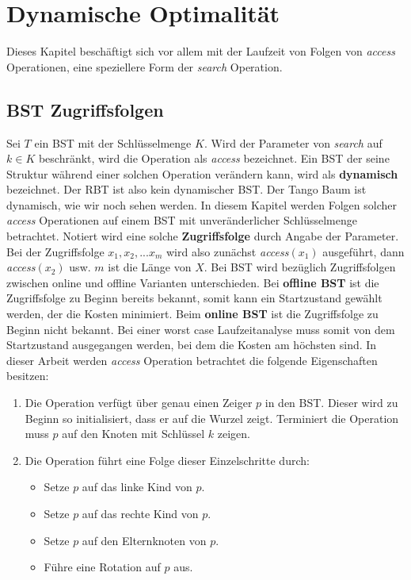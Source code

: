 \documentclass[a4paper,12pt]{article}
\begin{document}
\section{Dynamische Optimalität}
Dieses Kapitel beschäftigt sich vor allem mit der Laufzeit von Folgen von \textit{access} Operationen, eine speziellere Form der \textit{search} Operation.  
\subsection{BST Zugriffsfolgen}
Sei $T$ ein BST mit der Schlüsselmenge $K$. Wird der Parameter von \textit{search} auf $k \in K $ beschränkt, wird  die Operation als \textit{access} bezeichnet. Ein BST der seine Struktur während einer solchen Operation verändern kann, wird als \textbf{dynamisch} bezeichnet. Der RBT ist also kein dynamischer BST. Der Tango Baum ist dynamisch, wie wir noch sehen werden. In diesem Kapitel werden Folgen solcher \textit{access} Operationen auf einem BST mit unveränderlicher Schlüsselmenge betrachtet. Notiert wird eine solche \textbf{Zugriffsfolge} durch Angabe der Parameter. Bei der Zugriffsfolge $x_1,x_2,...x_m$ wird also zunächst \textit{access}$(x_1)$ ausgeführt, dann \textit{access}$(x_2)$ usw. $m$ ist die Länge von $X$. Bei BST wird bezüglich Zugriffsfolgen zwischen online und offline Varianten unterschieden. Bei \textbf{offline BST} ist die Zugriffsfolge zu Beginn bereits bekannt, somit kann ein Startzustand gewählt werden, der die Kosten minimiert. Beim \textbf{online BST} ist die Zugriffsfolge zu Beginn nicht bekannt. Bei einer worst case Laufzeitanalyse muss somit von dem Startzustand ausgegangen werden, bei dem die Kosten am höchsten sind.
In dieser Arbeit werden \textit{access} Operation betrachtet die folgende Eigenschaften besitzen:

\begin{enumerate} 
	\item Die Operation verfügt über genau einen Zeiger $p$ in den BST. Dieser wird zu Beginn so initialisiert, dass er auf die Wurzel zeigt. Terminiert die Operation muss $p$ auf den Knoten mit Schlüssel $k$ zeigen.
	\item Die Operation führt eine Folge dieser Einzelschritte durch:
	\begin{itemize}
		\item Setze $p$ auf das linke Kind von $p$.
		\item Setze $p$ auf das rechte Kind von $p$.
		\item Setze $p$ auf den Elternknoten von $p$.
		\item Führe eine Rotation auf $p$ aus.
	\end{itemize}  
	
\end{enumerate}
\end{document}

